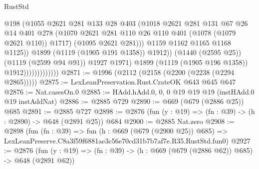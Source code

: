 \begin{lexlean}{RustStd}
\begin{coremodule}
                                        @198
                                        (@1055
                                          @2621
                                          @281
                                          @133
                                          @28
                                          @403
                                          (@1018
                                            @2621
                                            @281
                                            @131
                                            @67
                                            @26
                                            @14
                                            @401
                                            @278
                                            (@1070
                                              @2621
                                              @281
                                              @110
                                              @26
                                              @110
                                              @401
                                              (@1078 (@1079 @2621 @110))
                                              @1717)
                                            (@1095 @2621 @281)))
                                        @1159
                                        @1162
                                        @1165
                                        @1168
                                        @1125))
                                    @1899
                                    (@1119 (@1905 @191 @1358))
                                    @1912))
                                (@1440 (@2595 @25))
                                (@1119 (@2599 @94 @91))
                                @1927
                                @1971)
                              @1899
                              (@1119 (@1905 @196 @1358))
                              @1912)))))))))))))
@2871 := @1996 (@2112 (@2158 (@2200 (@2238 (@2294 @2865)))))
@2875 := LexLeanPreservation.Rust.CrateOK @643 @645 @647
@2876 := Nat.casesOn.{0}
@2885 := HAdd.hAdd.{0, 0, 0} @19 @19 @19 (instHAdd.{0} @19 instAddNat)
@2886 := @2885 @729
@2890 := @669 (@679 (@2886 @25)) @685
@2891 := @2885 @727
@2898 := @2876 (fun (y : @19) => (fn : @39) -> (h : @2890) -> @648 (@2891 @25)) @684
@2900 := @2885 Nat.zero
@2908 := @2898
    (fun (fn : @39) =>
    fun (h : @669 (@679 (@2900 @25)) @685) =>
    LexLeanPreserve.C8a3f59f6881ae3c56e70cd31b7b7af7e.R35.RustStd.fun0)
@2927 := @2876
    (fun (y : @19) => (fn : @39) -> (h : @669 (@679 (@2886 @62)) @685) -> @648 (@2891 @62))

\end{coremodule}
\end{lexlean}
